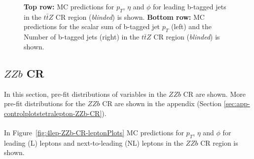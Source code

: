 \begin{figure}[htbp]
    \caption{\textbf{Top row:} MC predictions for $p_{T}$, $\eta$ and $\phi$ for leading b-tagged jets in the $t\bar{t}Z$ CR region (\textit{blinded}) is shown. \textbf{Bottom row:} MC predictions for the scalar sum of b-tagged jet $p_{T}$ (left) and the Number of b-tagged jets (right) in the $t\bar{t}Z$ CR region (\textit{blinded}) is shown.}
  \label{fig:4lep-ttZ-CR-bjetPlots}
\end{figure}




\subsection{$ZZb$ CR}
\label{sec:controlplotstetralepton-ZZb-CR}


In this section, pre-fit distributions of variables in the $ZZb$ CR are shown. More pre-fit distributions for the $ZZb$ CR are shown in the appendix (Section \ref{sec:app-controlplotstetralepton-ZZb-CR}).\\\\

In Figure~\ref{fig:4lep-ZZb-CR-leptonPlots} MC predictions for $p_{T}$, $\eta$ and $\phi$ for leading (L) leptons and next-to-leading (NL) leptons in the $ZZb$ CR region is shown.

